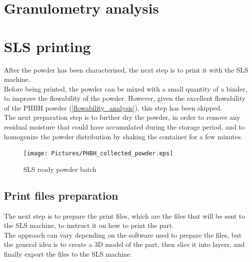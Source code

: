 \documentclass{article}
\begin{document}
    \clearpage

    \section{Granulometry analysis\label{granulometry_analysis}}

    \clearpage
    \section{SLS printing\label{SLS_printing_experimental}}

    After the powder has been characterized, the next step is to print it with the SLS machine. \\

    Before being printed, the powder can be mixed with a small quantity of a binder, to improve the flowability of the powder. 
    However, given the excellent flowability of the PHBH powder (\ref{flowability_analysis}), this step has been skipped. \\

    The next preparation step is to further dry the powder, in order to remove any residual moisture
    that could have accumulated during the storage period, and to homogenize the powder distribution 
    by shaking the container for a few minutes. \\

                \begin{figure}[h!]
                    \centering
                    \texttt{[image: Pictures/PHBH\_collected\_powder.eps]}
                    \caption{SLS ready powder batch}
                    \label{fig:PHBH_collected_powder}
                    
                \end{figure}

        \subsection{Print files preparation\label{Print_files_preparation}}

        The next step is to prepare the print files, which are the files that will be sent to the SLS machine, 
        to instruct it on how to print the part. \\

        The approach can vary depending on the software used to prepare the files, but the general idea is to 
        create a 3D model of the part, then slice it into layers, and finally export the files to the SLS machine. \\
\end{document}
